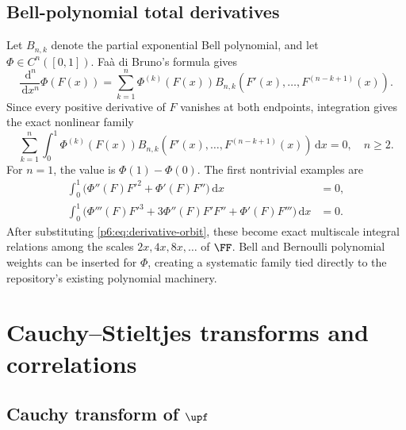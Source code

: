 \documentclass[11pt,oneside]{article}
\theoremstyle{definition}
\theoremstyle{remark}
\newcommand{\dd}{\,\mathrm d}
\newcommand{\1}{\mathbf 1}
\begin{document}
\subsection{Bell-polynomial total derivatives}

Let \(B_{n,k}\) denote the partial exponential Bell polynomial, and let
\(\Phi\in C^n([0,1])\).  Fa\`a di Bruno's formula gives
\begin{equation}
 \frac{\dd^n}{\dd x^n}\Phi(F(x))
 =\sum_{k=1}^n\Phi^{(k)}(F(x))
 B_{n,k}(F'(x),\ldots,F^{(n-k+1)}(x)).                    \label{p6:eq:Faa-di-Bruno}
\end{equation}
Since every positive derivative of \(F\) vanishes at both endpoints, integration gives
the exact nonlinear family
\begin{equation}
 \boxed{
 \sum_{k=1}^n\int_0^1\Phi^{(k)}(F(x))
 B_{n,k}(F'(x),\ldots,F^{(n-k+1)}(x))\dd x=0,
 \quad n\ge2.
 }                                                        \label{p6:eq:Bell-integrals}
\end{equation}
For \(n=1\), the value is \(\Phi(1)-\Phi(0)\).  The first nontrivial examples are
\begin{align}
 \int_0^1\bigl(\Phi''(F)F'^2+\Phi'(F)F''\bigr)\dd x&=0,  \label{p6:eq:Bell-n2}\\
 \int_0^1\bigl(\Phi'''(F)F'^3+3\Phi''(F)F'F''
   +\Phi'(F)F'''\bigr)\dd x&=0.                           \label{p6:eq:Bell-n3}
\end{align}
After substituting \eqref{p6:eq:derivative-orbit}, these become exact multiscale integral
relations among the scales \(2x,4x,8x,\ldots\) of \(\FF\).  Bell and Bernoulli
polynomial weights can be inserted for \(\Phi\), creating a systematic family tied
directly to the repository's existing polynomial machinery.

\section{Cauchy--Stieltjes transforms and correlations}

\subsection{Cauchy transform of \(\upf\)}
\end{document}

